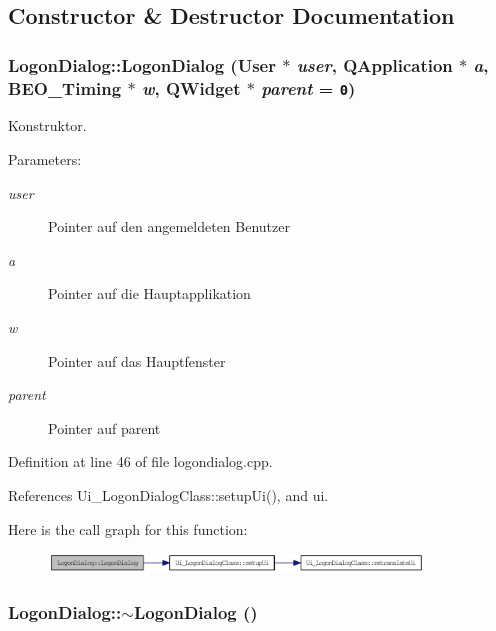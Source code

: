 \subsection{Constructor \& Destructor Documentation}
\hypertarget{class_logon_dialog_fd0f4977c07e5fbc9173d4ac35489f8b}{
\subsubsection[LogonDialog]{\setlength{\rightskip}{0pt plus 5cm}LogonDialog::LogonDialog ({\bf User} $\ast$ {\em user}, \/  QApplication $\ast$ {\em a}, \/  {\bf BEO\_\-Timing} $\ast$ {\em w}, \/  QWidget $\ast$ {\em parent} = {\tt 0})}}
\label{class_logon_dialog_fd0f4977c07e5fbc9173d4ac35489f8b}


Konstruktor. 

\begin{Desc}
\item[Parameters:]
\begin{description}
\item[{\em user}]Pointer auf den angemeldeten Benutzer \item[{\em a}]Pointer auf die Hauptapplikation \item[{\em w}]Pointer auf das Hauptfenster \item[{\em parent}]Pointer auf parent \end{description}
\end{Desc}


Definition at line 46 of file logondialog.cpp.

References Ui\_\-LogonDialogClass::setupUi(), and ui.

Here is the call graph for this function:\nopagebreak
\begin{figure}[H]
\begin{center}
\leavevmode
\includegraphics[width=282pt]{class_logon_dialog_fd0f4977c07e5fbc9173d4ac35489f8b_cgraph}
\end{center}
\end{figure}
\hypertarget{class_logon_dialog_da40d3f09891af804cce52c6b46ee597}{
\subsubsection[$\sim$LogonDialog]{\setlength{\rightskip}{0pt plus 5cm}LogonDialog::$\sim$LogonDialog ()}}
\label{class_logon_dialog_da40d3f09891af804cce52c6b46ee597}


